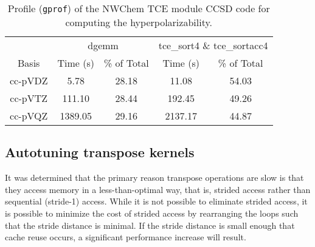 \documentclass[aps,preprint,groupedaddress]{revtex4-1}
\begin{document}
\begin{table}[!hp]
\caption{Profile (\texttt{gprof}) of the NWChem TCE module CCSD code for computing the hyperpolarizability.} \label{tab:profile2}
\begin{tabular}{ccccc}
\hline\hline
 & \multicolumn{2}{c}{dgemm} & \multicolumn{2}{c}{tce\_sort4 \& tce\_sortacc4} \\
   \cline{2-3} \cline{4-5}
Basis & Time (s) & \% of Total & Time (s) & \% of Total \\
\hline
cc-pVDZ &    5.78 & 28.18 &   11.08 & 54.03 \\
cc-pVTZ &  111.10 & 28.44 &  192.45 & 49.26 \\
cc-pVQZ & 1389.05 & 29.16 & 2137.17 & 44.87 \\
\hline\hline
\end{tabular}
\end{table}

\subsection{Autotuning transpose kernels}

It was determined that the primary reason transpose operations are slow is that they access memory in a less-than-optimal way, that is, strided access rather than sequential (stride-1) access.  While it is not possible to eliminate strided access, it is possible to minimize the cost of strided access by rearranging the loops such that the stride distance is minimal.  If the stride distance is small enough that cache reuse occurs, a significant performance increase will result.
\end{document}
